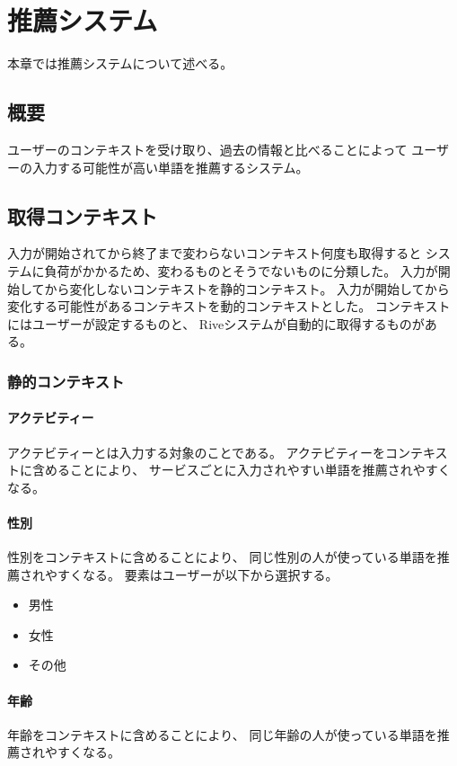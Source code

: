 \chapter{推薦システム}
\label{chap:recommend}
本章では推薦システムについて述べる。

\newpage
\section{概要}

ユーザーのコンテキストを受け取り、過去の情報と比べることによって
ユーザーの入力する可能性が高い単語を推薦するシステム。

\section{取得コンテキスト}
\label{sec:getcontext}
入力が開始されてから終了まで変わらないコンテキスト何度も取得すると
システムに負荷がかかるため、変わるものとそうでないものに分類した。
入力が開始してから変化しないコンテキストを静的コンテキスト。
入力が開始してから変化する可能性があるコンテキストを動的コンテキストとした。
コンテキストにはユーザーが設定するものと、
Riveシステムが自動的に取得するものがある。

\subsection{静的コンテキスト}

\subsubsection{アクテビティー}
アクテビティーとは入力する対象のことである。
アクテビティーをコンテキストに含めることにより、
サービスごとに入力されやすい単語を推薦されやすくなる。

\subsubsection{性別}
性別をコンテキストに含めることにより、
同じ性別の人が使っている単語を推薦されやすくなる。
要素はユーザーが以下から選択する。
\begin{itemize}
  \item 男性
  \item 女性
  \item その他
\end{itemize}

\subsubsection{年齢}
年齢をコンテキストに含めることにより、
同じ年齢の人が使っている単語を推薦されやすくなる。

